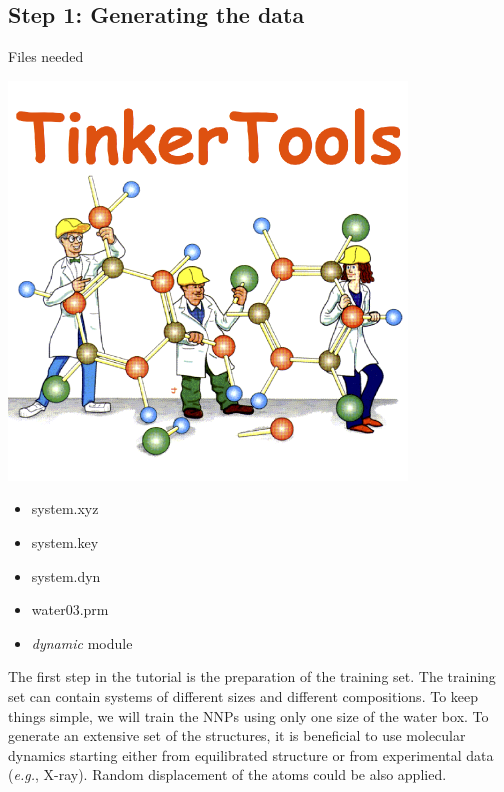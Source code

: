 \documentclass[12pt]{article}
\begin{document}
\subsection{Step 1: Generating the data}
\begin{mybox2}{{Files needed}}
\begin{minipage}[c]{0.5\linewidth}
\includegraphics[scale=0.2]{latex_files/tinker.png}
\end{minipage}
\begin{minipage}[c]{0.5\linewidth}
\begin{itemize}
    \item system.xyz
    \item system.key
    \item system.dyn
    \item water03.prm
    \item \textit{dynamic} module
\end{itemize}
\end{minipage}
\end{mybox2}

The first step in the tutorial is the preparation of the training set. The training set can contain systems of different sizes and different compositions. To keep things simple, we will train the NNPs using only one size of the water box. To generate an extensive set of the structures, it is beneficial to use molecular dynamics starting either from equilibrated structure or from experimental data (\textit{e.g.}, X-ray). Random displacement of the atoms could be also applied.
\end{document}
